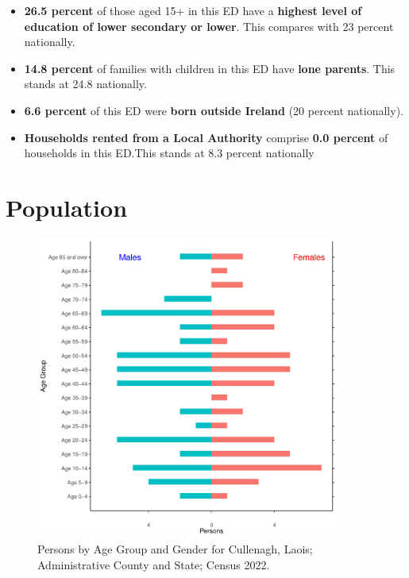 \documentclass{article}
\begin{document}
\begin{itemize}
\item \textbf{26.5 percent} of those aged 15+ in this ED have a \textbf{highest level of education of lower secondary or lower}. This compares with 23 percent nationally. 

\item \textbf{14.8 percent} of families with children in this ED have \textbf{lone parents}. This stands at 24.8 nationally.

\item \textbf{6.6 percent} of this ED were \textbf{born outside Ireland} (20 percent nationally).

\item \textbf{Households rented from a Local Authority} comprise \textbf{0.0 percent} of households in this ED.This stands at 8.3 percent nationally

\end{itemize}

\pagebreak

\section{Population} 
\label{sect:Pop}

\begin{figure}[h]
	\centering
	\includegraphics[width = 100mm]{../figures/PyramidPlot.pdf}
	\caption{Persons by Age Group and Gender for Cullenagh, Laois; Administrative County and State; Census 2022.}
	\label{fig:2ae19629-1a6a-13a3-e055-000000000001}
	\end{figure}
\end{document}
